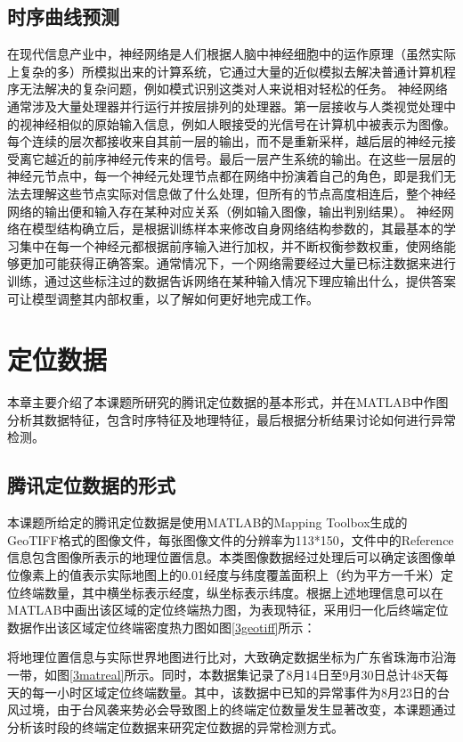 \documentclass[a4paper,AutoFakeBold,oneside,12pt]{book}
\begin{document}
{{\section{时序曲线预测}
在现代信息产业中，神经网络是人们根据人脑中神经细胞中的运作原理（虽然实际上复杂的多）所模拟出来的计算系统，它通过大量的近似模拟去解决普通计算机程序无法解决的复杂问题，例如模式识别这类对人来说相对轻松的任务。
	神经网络通常涉及大量处理器并行运行并按层排列的处理器。第一层接收与人类视觉处理中的视神经相似的原始输入信息，例如人眼接受的光信号在计算机中被表示为图像。每个连续的层次都接收来自其前一层的输出，而不是重新采样，越后层的神经元接受离它越近的前序神经元传来的信号。最后一层产生系统的输出。在这些一层层的神经元节点中，每一个神经元处理节点都在网络中扮演着自己的角色，即是我们无法去理解这些节点实际对信息做了什么处理，但所有的节点高度相连后，整个神经网络的输出便和输入存在某种对应关系（例如输入图像，输出判别结果）。
	神经网络在模型结构确立后，是根据训练样本来修改自身网络结构参数的，其最基本的学习集中在每一个神经元都根据前序输入进行加权，并不断权衡参数权重，使网络能够更加可能获得正确答案。通常情况下，一个网络需要经过大量已标注数据来进行训练，通过这些标注过的数据告诉网络在某种输入情况下理应输出什么，提供答案可让模型调整其内部权重，以了解如何更好地完成工作。


\chapter{定位数据}
本章主要介绍了本课题所研究的腾讯定位数据的基本形式，并在MATLAB中作图分析其数据特征，包含时序特征及地理特征，最后根据分析结果讨论如何进行异常检测。


\section{腾讯定位数据的形式}
	本课题所给定的腾讯定位数据是使用MATLAB的Mapping Toolbox生成的GeoTIFF格式的图像文件，每张图像文件的分辨率为113*150，文件中的Reference信息包含图像所表示的地理位置信息。本类图像数据经过处理后可以确定该图像单位像素上的值表示实际地图上的0.01经度与纬度覆盖面积上（约为平方一千米）定位终端数量，其中横坐标表示经度，纵坐标表示纬度。根据上述地理信息可以在MATLAB中画出该区域的定位终端热力图，为表现特征，采用归一化后终端定位数据作出该区域定位终端密度热力图如图\ref{3geotiff}所示：

	将地理位置信息与实际世界地图进行比对，大致确定数据坐标为广东省珠海市沿海一带，如图\ref{3matreal}所示。同时，本数据集记录了8月14日至9月30日总计48天每天的每一小时区域定位终端数量。其中，该数据中已知的异常事件为8月23日的台风过境，由于台风袭来势必会导致图上的终端定位数量发生显著改变，本课题通过分析该时段的终端定位数据来研究定位数据的异常检测方式。

}}
\end{document}

